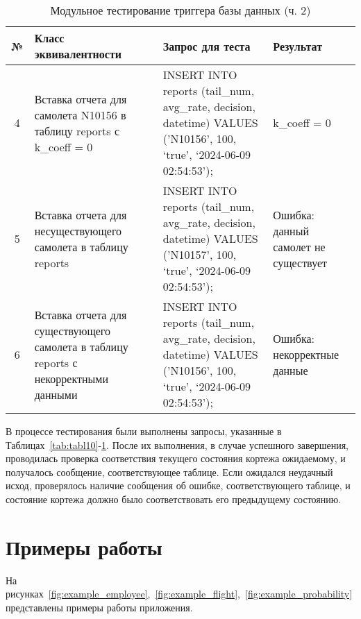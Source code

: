 \begin{table}[H]
    \centering
    \captionsetup{justification=raggedright}
    \caption{Модульное тестирование триггера базы данных (ч. 2)}
    \begin{tabular}{|c|p{}|p{}|p{}|}
        \hline
        № & Класс \newline эквивалентности & Запрос для теста & Результат \\
        \hline
        4 & Вставка отчета для \newline самолета N10156 в таблицу reports с \newline k\_coeff = 0 & INSERT INTO reports (tail\_num, avg\_rate, decision, datetime) VALUES ('N10156', 100, `true', `2024-06-09 02:54:53'); & k\_coeff = 0 \\
        \hline
        5 & Вставка отчета для несуществующего самолета в таблицу reports & INSERT INTO reports (tail\_num, avg\_rate, decision, datetime) VALUES ('N10157', 100, `true', `2024-06-09 02:54:53'); & Ошибка: данный самолет не существует \\
        \hline
        6 & Вставка отчета для \newline существующего \newline самолета в таблицу reports с \newline некорректными \newline данными & INSERT INTO reports (tail\_num, avg\_rate, decision, datetime) VALUES ('N10156', 100, `true', `2024-06-09 02:54:53'); & Ошибка: некорректные данные \\
        \hline
    \end{tabular}
    \label{tab:tabl11}
\end{table}

В процессе тестирования были выполнены запросы, указанные в Таблицах~\ref{tab:tabl10}-\ref{tab:tabl11}.
После их выполнения, в случае успешного завершения, проводилась проверка соответствия текущего состояния кортежа ожидаемому, и получалось сообщение, соответствующее таблице.
Если ожидался неудачный исход, проверялось наличие сообщения об ошибке, соответствующего таблице, и состояние кортежа должно было соответствовать его предыдущему состоянию.

\newpage
\section{Примеры работы}
На рисунках~\ref{fig:example_employee},~\ref{fig:example_flight},~\ref{fig:example_probability} представлены примеры работы приложения.

